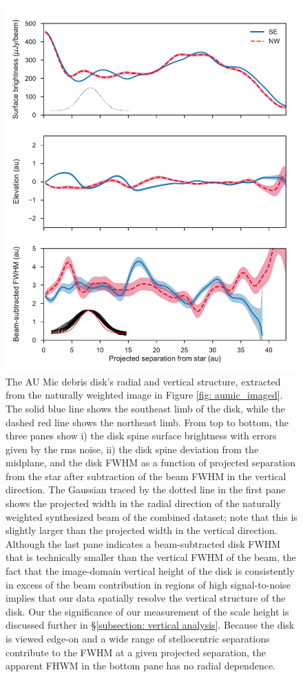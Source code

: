 \documentclass[modern]{aastex62}
\begin{document}
\begin{figure}
    \centering
    \includegraphics[width=.6\linewidth]{../figures/boccaletti_plots}
    \caption{
    The AU Mic debris disk's radial and vertical structure, extracted from the naturally weighted image in Figure \ref{fig: aumic_imaged}. 
    The solid blue line shows the southeast limb of the disk, while the dashed red line shows the northeast limb.
    From top to bottom, the three panes show i) the disk spine surface brightness with errors given by the rms noise, ii) the disk spine deviation from the midplane, and the disk FWHM as a function of projected separation from the star after subtraction of the beam FWHM in the vertical direction. 
    The Gaussian traced by the dotted line in the first pane shows the projected width in the radial direction of the naturally weighted synthesized beam of the combined dataset; note that this is slightly larger than the projected width in the vertical direction.
    Although the last pane indicates a beam-subtracted disk FWHM that is technically smaller than the vertical FWHM of the beam, the fact that the image-domain vertical height of the disk is consistently in excess of the beam contribution in regions of high signal-to-noise implies that our data spatially resolve the vertical structure of the disk.
    Our the significance of our measurement of the scale height is discussed further in \S \ref{subsection: vertical analysis}.
    Because the disk is viewed edge-on and a wide range of stellocentric separations contribute to the FWHM at a given projected separation, the apparent FHWM in the bottom pane has no radial dependence.}
    \label{fig: boccaletti}
\end{figure}
\end{document}
